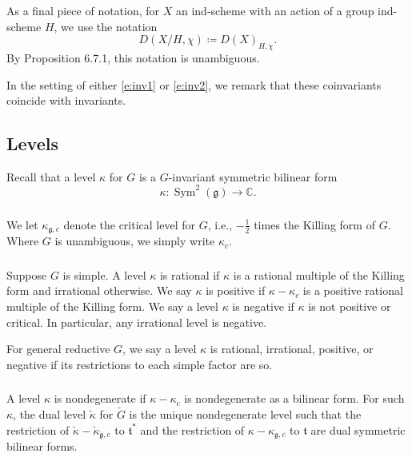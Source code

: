 \documentclass[11pt,reqno]{amsart}
\newcommand{\ft}{\mathfrak{t}}
\newcommand{\fg}{\mathfrak{g}}
\newcommand{\Sym}{\operatorname{Sym}}
\theoremstyle{remark}
\numberwithin{equation}{section}
\begin{document}
\subsubsection{}\label{sss:quot-not}

As a final piece of notation, for $X$ an ind-scheme with 
an action of a group ind-scheme $H$,
we use the notation
%
\begin{equation} \label{e:notinv}
D(X/H, \chi) \coloneqq D(X)_{H, \chi}.
\end{equation}
%
\noindent By \cite{rdm} Proposition 6.7.1, this
notation is unambiguous. 

In the setting of either \eqref{e:inv1} or \eqref{e:inv2},
we remark that these coinvariants coincide with invariants. 

\subsection{Levels} \label{ss:levels}

Recall that a {level} $\kappa$ for $G$ is a $G$-invariant
symmetric bilinear form \[\kappa:\Sym^2(\fg) \to \mathbb{C}.\]

\subsubsection{}
We let $\kappa_{\fg,c}$ denote the 
critical level for $G$, i.e., $-\frac{1}{2}$ times the Killing form
of $G$. Where $G$ is unambiguous, we simply write $\kappa_c$.


\subsubsection{}
Suppose $G$ is simple. A level $\kappa$ is rational 
if $\kappa$ is a rational multiple of the Killing form
and irrational otherwise.
We say $\kappa$ is positive if
$\kappa-\kappa_c$ is a positive rational multiple
of the Killing form. We say a level $\kappa$ is 
negative
if $\kappa$ is not positive or critical.
In particular, any irrational level is negative.

For general reductive $G$, we say a level $\kappa$
is rational, irrational, positive,
or negative if its restrictions to each simple factor
are so.

\subsubsection{}
A level $\kappa$ is nondegenerate if $\kappa-\kappa_c$ is 
nondegenerate as a bilinear form. 
For such $\kappa$, the dual level
$\check{\kappa}$ for $\check{G}$ is the unique nondegenerate level
such that the restriction of $\check{\kappa}-\check{\kappa}_{\check{\fg},c}$ 
to $\ft^*$
and the restriction of $\kappa-\kappa_{\fg,c}$ to ${\ft}$ are dual symmetric 
bilinear forms.
\end{document}
